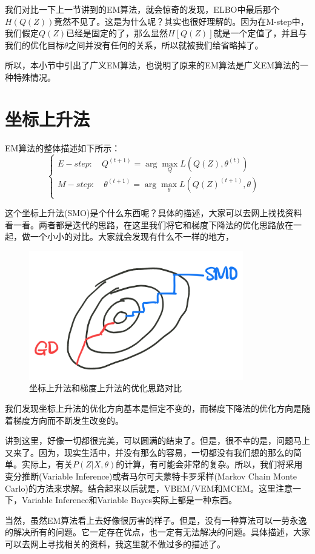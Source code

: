\documentclass[a4paper]{article}
\begin{document}
我们对比一下上一节讲到的EM算法，就会惊奇的发现，ELBO中最后那个$H(Q(Z))$竟然不见了。这是为什么呢？其实也很好理解的。因为在M-step中，我们假定$Q(Z)$已经是固定的了，那么显然$H[Q(Z)]$就是一个定值了，并且与我们的优化目标$\theta$之间并没有任何的关系，所以就被我们给省略掉了。

所以，本小节中引出了广义EM算法，也说明了原来的EM算法是广义EM算法的一种特殊情况。

\section{坐标上升法}
EM算法的整体描述如下所示：
\begin{equation}
    \left\{
    \begin{array}{ll}
      E-step:\quad Q^{(t+1)} = \arg\max_{Q} L(Q(Z),\theta^{(t)}) & \\
      M-step:\quad \theta^{(t+1)} = \arg\max_{\theta} L(Q(Z)^{(t+1)},\theta) & \\
    \end{array}
    \right.
\end{equation}

这个坐标上升法(SMO)是个什么东西呢？具体的描述，大家可以去网上找找资料看一看。两者都是迭代的思路，在这里我们将它和梯度下降法的优化思路放在一起，做一个小小的对比。大家就会发现有什么不一样的地方，
\begin{figure}[H]
    \centering
    \includegraphics[width=.40\textwidth]{微信图片_20191219100509.png}
    \caption{坐标上升法和梯度上升法的优化思路对比}
    \label{fig:my_label_1}
\end{figure}

我们发现坐标上升法的优化方向基本是恒定不变的，而梯度下降法的优化方向是随着梯度方向而不断发生改变的。

讲到这里，好像一切都很完美，可以圆满的结束了。但是，很不幸的是，问题马上又来了。因为，现实生活中，并没有那么的容易，一切都没有我们想的那么的简单。实际上，有关$P(Z|X,\theta)$的计算，有可能会非常的复杂。所以，我们将采用变分推断(Variable Inference)或者马尔可夫蒙特卡罗采样(Markov Chain Monte Carlo)的方法来求解。结合起来以后就是，VBEM/VEM和MCEM。这里注意一下，Variable Inference和Variable Bayes实际上都是一种东西。

当然，虽然EM算法看上去好像很厉害的样子。但是，没有一种算法可以一劳永逸的解决所有的问题。它一定存在优点，也一定有无法解决的问题。具体描述，大家可以去网上寻找相关的资料，我这里就不做过多的描述了。
\end{document}
